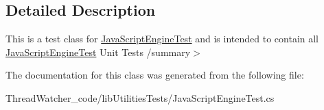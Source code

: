 \subsection{Detailed Description}
This is a test class for \hyperlink{classlib_utilities_tests_1_1_java_script_engine_test}{Java\+Script\+Engine\+Test} and is intended to contain all \hyperlink{classlib_utilities_tests_1_1_java_script_engine_test}{Java\+Script\+Engine\+Test} Unit Tests /summary$>$ 

The documentation for this class was generated from the following file\+:\begin{DoxyCompactItemize}
\item 
Thread\+Watcher\+\_\+code/lib\+Utilities\+Tests/Java\+Script\+Engine\+Test.\+cs\end{DoxyCompactItemize}
